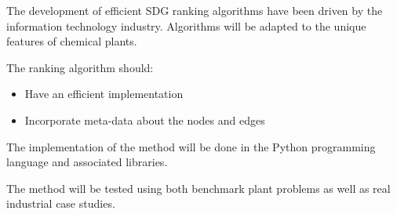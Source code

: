 \documentclass{article}
\begin{document}
The development of efficient SDG ranking algorithms have been driven by the information technology industry.
Algorithms will be adapted to the unique features of chemical plants.

The ranking algorithm should:
\begin{itemize}
\item Have an efficient implementation


\item Incorporate meta-data about the nodes and edges

%
\end{itemize}

The implementation of the method will be done in the Python programming language and associated libraries.

The method will be tested using both benchmark plant problems as well as real industrial case studies.
\end{document}
